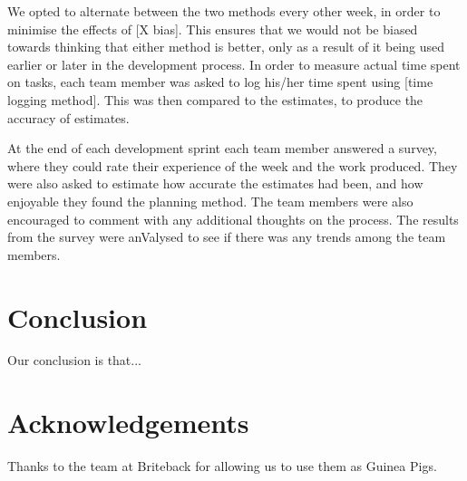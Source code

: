\documentclass{sigchi}
\begin{document}
We opted to alternate between the two methods every other week, in order to minimise the effects of [X bias]. This ensures that we would not be biased towards thinking that either method is better, only as a result of it being used earlier or later in the development process.
In order to measure actual time spent on tasks, each team member was asked to log his/her time spent using [time logging method]. This was then compared to the estimates, to produce the accuracy of estimates.

At the end of each development sprint each team member answered a survey, where they could rate their experience of the week and the work produced. They were also asked to estimate how accurate the estimates had been, and how enjoyable they found the planning method. The team members were also encouraged to comment with any additional thoughts on the process.
The results from the survey were anValysed to see if there was any trends among the team members.

\section{Conclusion}

Our conclusion is that...

\section{Acknowledgements}

Thanks to the team at Briteback for allowing us to use them as Guinea Pigs.

%
%
%
%
%
\balance




\end{document}

